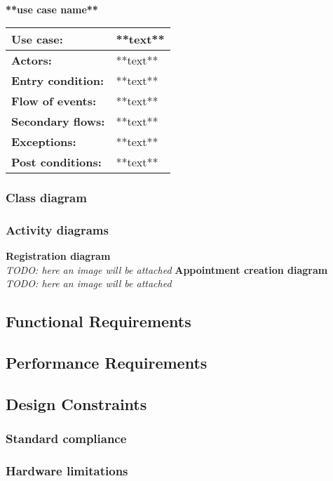 			\\
		\textbf{**use case name**}
		\begin{table}[h!]
			\begin{tabu} to \textwidth {| X[\fcWidth,r,p] | X[1-\fcWidth,l,p] |}
				\hline\textbf{Use case:} & **text**
				\\
				\hline\textbf{Actors:} & **text**
				\\
				\hline\textbf{Entry condition:} & **text**
				\\
				\hline\textbf{Flow of events:} & **text**
				\\
				\hline\textbf{Secondary flows:} & **text**
				\\
				\hline\textbf{Exceptions:} & **text**
				\\
				\hline\textbf{Post conditions:} & **text**
				\\
				\hline
			\end{tabu}
		\end{table}
	\subsubsection{Class diagram}
	\subsubsection{Activity diagrams}
		\textbf{Registration diagram} \\
		\indent \textit{TODO: here an image will be attached}
		\newline
		\textbf{Appointment creation diagram} \\
		\indent \textit{TODO: here an image will be attached}
\subsection{Functional Requirements}
\subsection{Performance Requirements}
\subsection{Design Constraints}
	\subsubsection{Standard compliance}
	\subsubsection{Hardware limitations}
